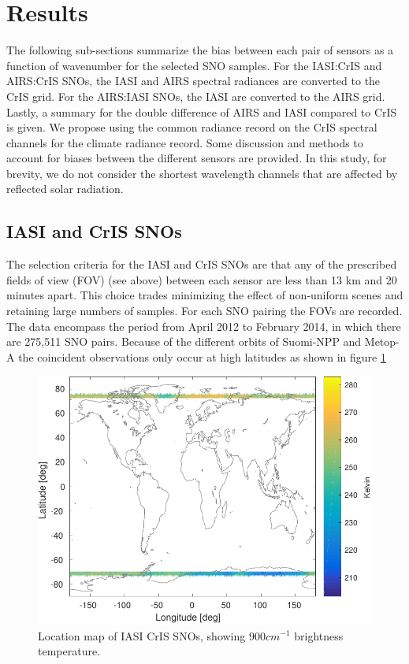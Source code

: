 \documentclass[twocolumn,10pt]{article}
\begin{document}
\section{Results}
\label{sec:orgheadline12}
The following sub-sections summarize the bias between each pair of sensors as a function of wavenumber for the selected SNO samples. For the IASI:CrIS and AIRS:CrIS SNOs, the IASI and AIRS spectral radiances are converted to the CrIS grid.  For the AIRS:IASI SNOs, the IASI are converted to the AIRS grid. Lastly, a summary for the double difference of AIRS and IASI compared to CrIS is given. We propose using the common radiance record on the CrIS spectral channels for the climate radiance record. Some discussion and methods to account for biases between the different sensors are provided. In this study, for brevity, we do not consider the shortest wavelength channels that are affected by reflected solar radiation.

\subsection{IASI and CrIS SNOs}
\label{sec:orgheadline8}
The selection criteria for the IASI and CrIS SNOs are that any of the prescribed fields of view (FOV) (see above) between each sensor are less than 13 km and 20 minutes apart. This choice trades minimizing the effect of non-uniform scenes and retaining large numbers of samples.  For each SNO pairing the FOVs are recorded. The data encompass the period from April 2012 to February 2014, in which there are 275,511 SNO pairs. Because of the different orbits
of Suomi-NPP and Metop-A the coincident observations only occur at high latitudes as
shown in figure \ref{fig:X1}

\begin{figure}[htb]
\centering
\includegraphics[width=\linewidth]{./figs/IC_jplSNO_900wn_map.pdf}
\caption{\label{fig:orgparagraph3}
  Location map of IASI CrIS SNOs, showing $900 cm^{-1}$ brightness temperature.}
\label{fig:X1}
\end{figure}
\end{document}
